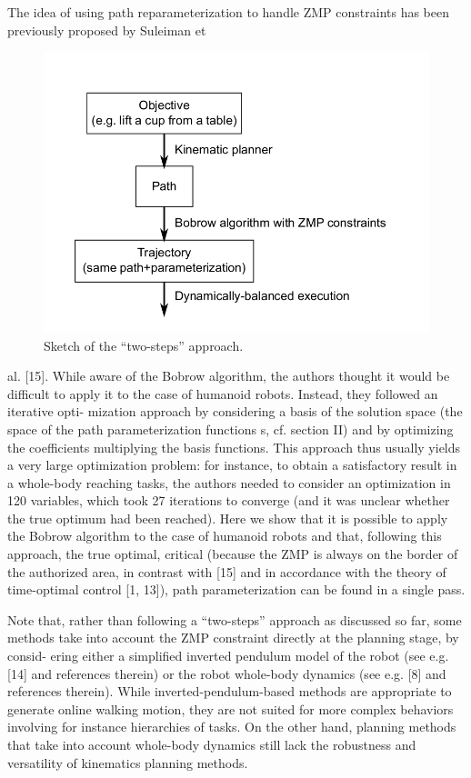 \documentclass[journal]{IEEEtran}
\begin{document}
The idea of using path reparameterization to handle ZMP
constraints has been previously proposed by Suleiman et

\begin{figure}
  \centering
  \includegraphics[width=.4\textwidth]{1.png}
  \caption{Sketch of the “two-steps” approach.}
  \label{img1}
\end{figure}

al. [15]. While aware of the Bobrow algorithm, the authors
thought it would be difficult to apply it to the case of
humanoid robots. Instead, they followed an iterative opti-
mization approach by considering a basis of the solution
space (the space of the path parameterization functions s,
cf. section II) and by optimizing the coefficients multiplying
the basis functions. This approach thus usually yields a
very large optimization problem: for instance, to obtain a
satisfactory result in a whole-body reaching tasks, the authors
needed to consider an optimization in 120 variables, which
took 27 iterations to converge (and it was unclear whether
the true optimum had been reached). Here we show that
it is possible to apply the Bobrow algorithm to the case
of humanoid robots and that, following this approach, the
true optimal, critical (because the ZMP is always on the
border of the authorized area, in contrast with [15] and in
accordance with the theory of time-optimal control [1, 13]),
path parameterization can be found in a single pass.

Note that, rather than following a “two-steps” approach
as discussed so far, some methods take into account the
ZMP constraint directly at the planning stage, by consid-
ering either a simplified inverted pendulum model of the
robot (see e.g. [14] and references therein) or the robot
whole-body dynamics (see e.g. [8] and references therein).
While inverted-pendulum-based methods are appropriate to
generate online walking motion, they are not suited for more
complex behaviors involving for instance hierarchies of tasks.
On the other hand, planning methods that take into account
whole-body dynamics still lack the robustness and versatility
of kinematics planning methods.
\end{document}

